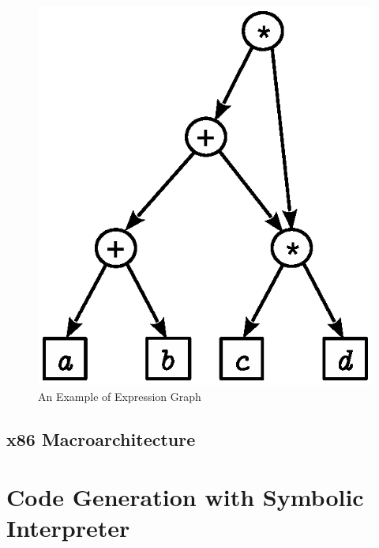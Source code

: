 \begin{figure}[t]
  \centering
  \includegraphics[scale=0.7]{images/06-11.eps}
  \caption{An Example of Expression Graph}
  \label{expression-example}
\end{figure}

\subsection{x86 Macroarchitecture}

\section{Code Generation with Symbolic Interpreter}

\section{}


